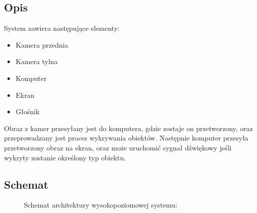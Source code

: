 \subsection{Opis}
System zawiera następujące elementy:
\begin{itemize}
	\item Kamera przednia
	\item Kamera tylna
	\item Komputer
	\item Ekran
	\item Głośnik
\end{itemize}

Obraz z kamer przesyłany jest do komputera, gdzie zostaje on przetworzony, oraz przeprowadzany jest proces wykrywania obiektów. Następnie komputer przesyła przetworzony obraz na ekran, oraz może uruchomić sygnał dźwiękowy jeśli wykryty zostanie określony typ obiektu.



\subsection{Schemat}
    \begin{figure}[H]
	\centering
	\caption{Schemat architektury wysokopoziomowej systemu:}
	\label{fig:architektura_diagram}
\end{figure}